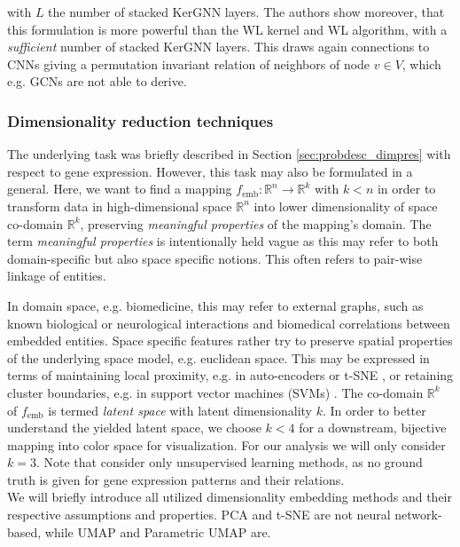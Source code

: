 \documentclass[]{article}
\renewcommand{\cite}{\citep}
\begin{document}
with $L$ the number of stacked KerGNN layers. The authors show moreover, that this formulation is more powerful than the WL kernel and WL algorithm, with a \textit{sufficient} number of stacked KerGNN layers. This draws again connections to CNNs giving a permutation invariant relation of neighbors of node $v\in V$, which e.g. GCNs are not able to derive. 


\subsubsection{Dimensionality reduction techniques}

The underlying task was briefly described in Section \ref{sec:probdesc_dimpres} with respect to gene expression. However, this task may also be formulated in a general. Here, we want to find a mapping $f_\text{emb}:\mathbb{R}^n\rightarrow \mathbb{R}^k$ with $k<n$ in order to transform data in high-dimensional space $\mathbb{R}^n$ into lower dimensionality of space co-domain $\mathbb{R}^k$, preserving \textit{meaningful properties} of the mapping's domain. The term \textit{meaningful properties} is intentionally held vague as this may refer to both domain-specific but also space specific notions. This often refers to pair-wise linkage of entities.

In domain space, e.g. biomedicine, this may refer to external graphs, such as known biological or neurological interactions and biomedical correlations between embedded entities. Space specific features rather try to preserve spatial properties of the underlying space model, e.g. euclidean space. This may be expressed in terms of maintaining local proximity, e.g. in auto-encoders \cite{ng2011sparse} or t-SNE \cite{van2008visualizing}, or retaining cluster boundaries, e.g. in support vector machines (SVMs) \cite{noble2006support}. The co-domain $\mathbb{R}^k$ of $f_\text{emb}$ is termed \textit{latent space} with latent dimensionality $k$.
In order to better understand the yielded latent space, we choose $k<4$ for a downstream, bijective mapping into color space for visualization. For our analysis we will only consider $k=3$. Note that consider only unsupervised learning methods, as no ground truth is given for gene expression patterns and their relations.\\

We will briefly introduce all utilized dimensionality embedding methods and their respective assumptions and properties. PCA and t-SNE are not neural network-based, while UMAP and Parametric UMAP are.
\end{document}
